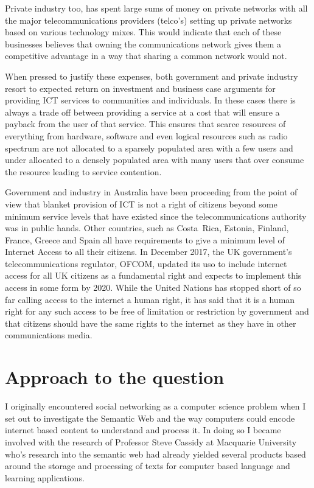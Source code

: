 Private industry too, has spent large sums of money on private networks with all the major telecommunications providers (telco's) setting up private networks based on various technology mixes. This would indicate that each of these businesses believes that owning the communications network gives them a competitive advantage in a way that sharing a common network would not.

When pressed to justify these expenses, both government and private industry resort to expected return on investment and business case arguments for providing ICT services to communities and individuals. In these cases there is always a trade off between providing a service at a cost that will ensure a payback from the user of that service. This ensures that scarce resources of everything from hardware, software and even logical resources such as radio spectrum are not allocated to a sparsely populated area with a few users and under allocated to a densely populated area with many users that over consume the resource leading to service contention.

Government and industry in Australia have been proceeding from the point of view that blanket provision of ICT is not a right of citizens beyond some minimum service levels that have existed since the telecommunications authority was in public hands. Other countries, such as Costa~Rica, Estonia, Finland, France, Greece and Spain all have requirements to give a minimum level of Internet Access to all their citizens.%
 In December 2017, the UK government's telecommunications regulator, OFCOM, updated its \acrfull{uso}  to include internet access for all UK citizens as a fundamental right and expects to implement this access in some form by 2020\autocite{RefWorks:420}. While the United Nations has stopped short of so far calling access to the internet a human right, it has said that it is a human right for any such access to be free of limitation or restriction by government and that citizens should have the same rights to the internet as they have in other communications media\cite{RefWorks:421}.

\section{Approach to the question}


I originally encountered social networking as a computer science problem when I set out to investigate the Semantic Web and the way computers could encode internet based content to understand and process it. In doing so I became involved with the research of Professor Steve Cassidy at Macquarie University who's research into the semantic web had already yielded several products based around the storage and processing of texts for computer based language and learning applications.

